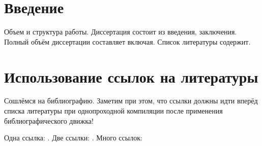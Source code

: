 \documentclass[a4paper, 12pt, oneside, openany]{memoir}
\begin{document}
  
    \chapter{Введение}
    Объем и структура работы. Диссертация состоит из введения,
    заключения. Полный объём диссертации составляет включая. 
    Список литературы содержит.
    

    
    
    \pagebreak
    \chapter*{Использование ссылок на литературы}
    Сошлёмся на библиографию. Заметим при этом, что ссылки должны идти вперёд списка литературы 
    при однопроходной компиляции после применения библиографического движка!
    

    Одна ссылка:    \cite[с.~54]{Sokolov} \cite[с.~36]{Gaidaenko}.
    Две ссылки:     \cite{Sokolov, Gaidaenko}.
    Много ссылок:   \cite{Lermontov, Management, Borozda, Marketing, Constitution, FamilyCode,
    Gost.7.0.53, Razumovski, Lagkueva, Pokrovski, Methodology, Berestova, Kriger}
    
    \insertBiblio
\end{document}
